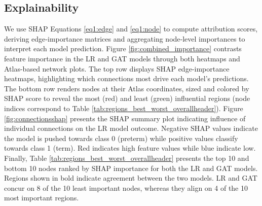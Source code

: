 \documentclass[doubleblind]{ecai}
\begin{document}
\subsection{Explainability}

We use SHAP Equations \ref{eq1:edge} and \ref{eq1:node} to compute attribution scores, deriving edge‑importance matrices and aggregating node‑level importances to interpret each model prediction. Figure \ref{fig:combined_importance} contrasts feature importance in the LR and GAT models through both heatmaps and Atlas-based network plots. The top row displays SHAP edge‐importance heatmaps, highlighting which connections most drive each model’s predictions. The bottom row renders nodes at their Atlas coordinates, sized and colored by SHAP score to reveal the most (red) and least (green) influential regions (node indices correspond to Table \ref{tab:regions_best_worst_overallheader}). Figure \ref{fig:connectionsshap} presents the SHAP summary plot indicating influence of individual connections on the LR model outcome. Negative SHAP values indicate the model is pushed towards class 0 (preterm) while positive values classify towards class 1 (term). Red indicates high feature values while blue indicate low. Finally, Table \ref{tab:regions_best_worst_overallheader} presents the top 10 and bottom 10 nodes ranked by SHAP importance for both the LR and GAT models. Regions shown in bold indicate agreement between the two models. LR and GAT concur on 8 of the 10 least important nodes, whereas they align on 4 of the 10 most important regions.
\end{document}

